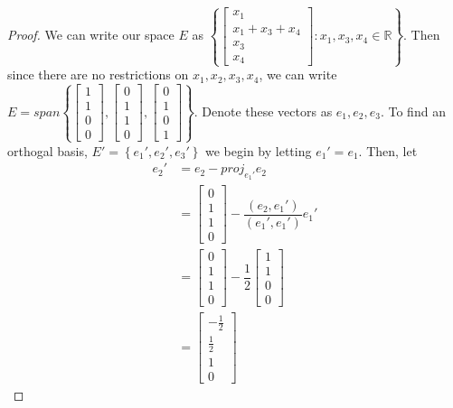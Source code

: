 \documentclass{article}
\begin{document}
\begin{proof}
We can write our space $E$ as $\left\{ \begin{bmatrix}x_1\\x_1+x_3+x_4\\x_3\\x_4\end{bmatrix}: x_1, x_3, x_4 \in \mathbb{R} \right\}$. Then since there are no restrictions on $x_1, x_2, x_3, x_4$, we can write $E = span \left\{ \begin{bmatrix}1\\1\\0\\0\end{bmatrix}, \begin{bmatrix}0\\1\\1\\0\end{bmatrix}, \begin{bmatrix}0\\1\\0\\1\end{bmatrix} \right\}$. Denote these vectors as $e_1, e_2, e_3$. To find an orthogal basis, $E' = \left\{e_1',e_2',e_3'\right\}$ we begin by letting $e_1'=e_1$. Then, let
\begin{align*}
e_2' & = e_2 - proj_{e_1'}e_2 \\
& = \begin{bmatrix}0\\1\\1\\0\end{bmatrix} - \dfrac{(e_2,e_1')}{(e_1',e_1')}e_1' \\
& = \begin{bmatrix}0\\1\\1\\0\end{bmatrix}  - \dfrac{1}{2}\begin{bmatrix}1\\1\\0\\0\end{bmatrix} \\
& = \begin{bmatrix}-\frac{1}{2}\\ \frac{1}{2} \\ 1 \\ 0 \end{bmatrix}
\end{align*}


\end{proof}
\end{document}
